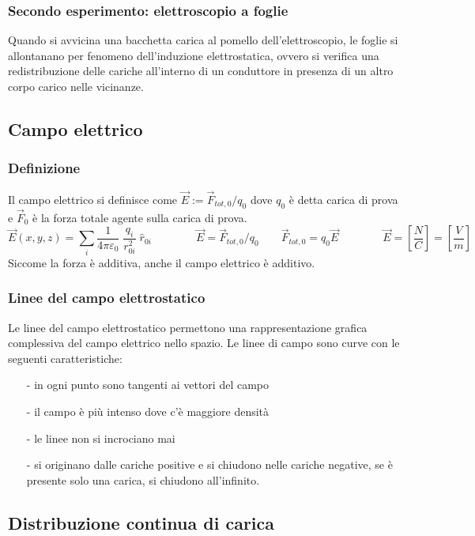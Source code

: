 \documentclass[a4paper]{article}
\begin{document}
\subsubsection*{Secondo esperimento: elettroscopio a foglie}
Quando si avvicina una bacchetta carica al pomello dell'elettroscopio, le foglie si allontanano per fenomeno dell'induzione
elettrostatica, ovvero si verifica una redistribuzione delle cariche all'interno di un conduttore in presenza di un altro corpo
carico nelle vicinanze.

\subsection{Campo elettrico}
\subsubsection*{Definizione}
Il campo elettrico si definisce come \(\vec{E} := \vec{F}_{tot,0}/q_0\) dove \(q_0\) è detta carica di prova e \(\vec{F}_0\) è
la forza totale agente sulla carica di prova.
\[\vec{E}(x,y,z) = \sum_{i} \frac{1}{4 \pi \varepsilon_0} \; \frac{q_i}{r_{0i}^2} \; \hat{r}_{0i} \qquad \qquad \vec{E} = \vec{F}_{tot,0}/q_0 \qquad \vec{F}_{tot,0} = q_0 \vec{E} \qquad \qquad \vec{E} = \left[ \frac{N}{C} \right] = \left[ \frac{V}{m} \right]\]
Siccome la forza è additiva, anche il campo elettrico è additivo.

\subsubsection*{Linee del campo elettrostatico}
Le linee del campo elettrostatico permettono una rappresentazione grafica complessiva del campo elettrico nello spazio. Le linee
di campo sono curve con le seguenti caratteristiche:
\begin{itemize}[topsep=3pt, itemsep=0pt]
	\item[-] in ogni punto sono tangenti ai vettori del campo
	\item[-] il campo è più intenso dove c'è maggiore densità
	\item[-] le linee non si incrociano mai
	\item[-] si originano dalle cariche positive e si chiudono nelle cariche negative, se è presente solo una carica, si chiudono
	all'infinito.
\end{itemize}

\subsection{Distribuzione continua di carica}
\end{document}

